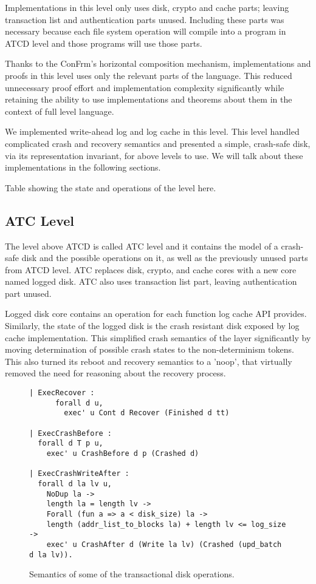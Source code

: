 Implementations in this level only uses disk, crypto and cache parts; leaving transaction list and authentication parts unused. Including these parts was necessary because each file system operation will compile into a program in ATCD level and those programs will use those parts. 

Thanks to the ConFrm's horizontal composition mechanism, implementations and proofs in this level uses only the relevant parts of the language. This reduced unnecessary proof effort and implementation complexity significantly while retaining the ability to use implementations and theorems about them in the context of full level language.

We implemented write-ahead log and log cache in this level. This level handled complicated crash and recovery semantics and presented a simple, crash-safe disk, via its representation invariant, for above levels to use. We will talk about these implementations in the following sections.

{\color{red} Table showing the state and operations of the level here}.

\subsection{ATC Level}
The level above ATCD is called ATC level and it contains the model of a crash-safe disk and the possible operations on it, as well as the previously unused parts from ATCD level. ATC replaces disk, crypto, and cache cores with a new core named logged disk. ATC also uses transaction list part, leaving authentication part unused.

Logged disk core contains an operation for each function log cache API provides. Similarly, the state of the logged disk is the crash resistant disk exposed by log cache implementation. This simplified crash semantics of the layer significantly by moving determination of possible crash states to the non-determinism tokens. This also turned its reboot and recovery semantics to a 'noop', that virtually removed the need for reasoning about the recovery process. 

\begin{figure}[ht]
    \centering
\begin{verbatim}
| ExecRecover : 
      forall d u,
        exec' u Cont d Recover (Finished d tt)
        
| ExecCrashBefore :
  forall d T p u,
    exec' u CrashBefore d p (Crashed d)

| ExecCrashWriteAfter :
  forall d la lv u,
    NoDup la ->
    length la = length lv ->
    Forall (fun a => a < disk_size) la ->
    length (addr_list_to_blocks la) + length lv <= log_size ->
    exec' u CrashAfter d (Write la lv) (Crashed (upd_batch d la lv)).
\end{verbatim}
    \caption{Semantics of some of the transactional disk operations.}
    \label{fig:LD_Crash_Semantics}
\end{figure}

